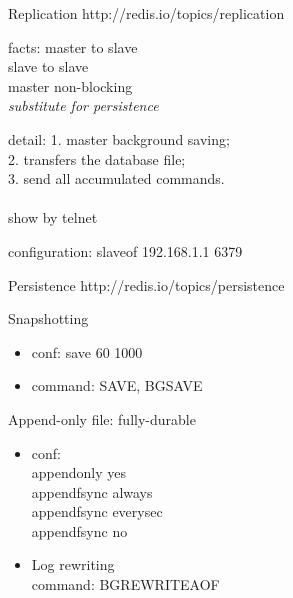 \documentclass{beamer}
\begin{document}
\begin{frame}{Replication}
  http://redis.io/topics/replication \\
  \pause
  \begin{block}{facts:}
    master to slave \\
    slave to slave \\
    master non-blocking \\
    \emph{substitute for persistence} \\
  \end{block}
  \pause
  \begin{block}{detail:}
    1. master background saving; \\
    2. transfers the database file; \\
    3. send all accumulated commands. \\
    ~\\
    \pause
    show by telnet \\
  \end{block}
  \pause
  \begin{block}{configuration:}
    slaveof 192.168.1.1 6379 \\
  \end{block}

\end{frame}






\begin{frame}{Persistence}
  http://redis.io/topics/persistence \\
  \pause
  \begin{block}{Snapshotting}
    \begin{itemize}
    \item conf: save 60 1000 \\
    \item command: SAVE, BGSAVE \\
    \end{itemize}
  \end{block}

  \pause
  \begin{block}{Append-only file:  fully-durable}
    \begin{itemize}
    \item conf: \\
      appendonly yes \\
      appendfsync always \\
      appendfsync everysec \\
      appendfsync no \\
    \item Log rewriting \\
      command: BGREWRITEAOF \\
    \end{itemize}
  \end{block}

\end{frame}
\end{document}
